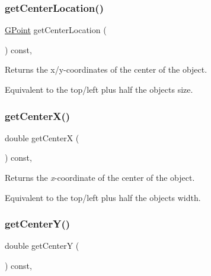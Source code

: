 \subsubsection{\texorpdfstring{get\+Center\+Location()}{getCenterLocation()}}
{\footnotesize\ttfamily \mbox{\hyperlink{structsgl_1_1GPoint}{G\+Point}} get\+Center\+Location (\begin{DoxyParamCaption}{ }\end{DoxyParamCaption}) const\hspace{0.3cm}{\ttfamily [virtual]}, {\ttfamily [inherited]}}



Returns the x/y-\/coordinates of the center of the object. 

Equivalent to the top/left plus half the object\textquotesingle{}s size. \mbox{\label{classsgl_1_1GObject_a04df74355b545e0543112d5b8d924176}} 
\subsubsection{\texorpdfstring{get\+Center\+X()}{getCenterX()}}
{\footnotesize\ttfamily double get\+CenterX (\begin{DoxyParamCaption}{ }\end{DoxyParamCaption}) const\hspace{0.3cm}{\ttfamily [virtual]}, {\ttfamily [inherited]}}



Returns the {\itshape x}-\/coordinate of the center of the object. 

Equivalent to the top/left plus half the object\textquotesingle{}s width. \mbox{\label{classsgl_1_1GObject_acb3287a3d507025a26f54b895713b947}} 
\subsubsection{\texorpdfstring{get\+Center\+Y()}{getCenterY()}}
{\footnotesize\ttfamily double get\+CenterY (\begin{DoxyParamCaption}{ }\end{DoxyParamCaption}) const\hspace{0.3cm}{\ttfamily [virtual]}, {\ttfamily [inherited]}}



